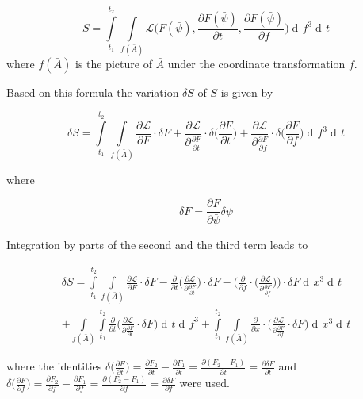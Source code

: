\documentclass{article}
\DeclareMathOperator{\dd}{d\!}
\begin{document}
\begin{equation}
S = \int\limits_{t_1}^{t_2} \int\limits_{f(\bar{A})} \mathcal{L}\bigg(F(\bar{\psi}), \frac{\partial F(\bar{\psi})}{\partial t}, \frac{\partial F(\bar{\psi})}{\partial f}\bigg) 
\dd f^3 \dd t 
\end{equation}
where $f(\bar{A})$ is the picture of $\bar{A}$ under the coordinate transformation $f$.

Based on this formula the variation $\delta S$ of $S$ is given by

\begin{equation}
\delta S = \int\limits_{t_1}^{t_2} \int\limits_{f(\bar{A})} 
\frac{\partial \mathcal{L}}{\partial F} \cdot \delta F
+ \frac{\partial \mathcal{L}}{\partial \frac{\partial F}{\partial t}} \cdot \delta \bigg(\frac{\partial F}{\partial t}\bigg)
+ \frac{\partial \mathcal{L}}{\partial \frac{\partial F}{\partial f}} \cdot \delta \bigg(\frac{\partial F} {\partial f}\bigg)
\dd f^3 \dd t
\end{equation}

where 

\begin{equation} \label{deltaFDefinition}
\delta F = \frac{\partial F}{\partial \bar{\psi}} \delta \bar{\psi}
\end{equation}


Integration by parts of the second and the third term leads to

\begin{equation} \label{calcDeltaSSection3}
\begin{split}
\delta S = \int\limits_{t_1}^{t_2} \int\limits_{f(\bar{A})} 
\frac{\partial \mathcal{L}}{\partial F} \cdot \delta F
-\frac{\partial}{\partial t} \bigg( \frac{\partial \mathcal{L}}{\partial \frac{\partial F}{\partial t}} \bigg) \cdot \delta F
-\bigg(\frac{\partial}{\partial f} \cdot \bigg( \frac{\partial \mathcal{L}}{\partial \frac{\partial F}{\partial f}} \bigg)\bigg) \cdot \delta F
\dd x^3 \dd t \\
+ \int\limits_{f(\bar{A})} \int\limits_{t_1}^{t_2} \frac{\partial}{\partial t} \bigg(\frac{\partial \mathcal{L}}{\partial \frac{\partial F}{\partial t}} \cdot \delta F \bigg) \dd t \dd f^3
+ \int\limits_{t_1}^{t_2} 
\int\limits_{f(\bar{A})} \frac{\partial}{\partial x} \cdot \bigg( \frac{\partial \mathcal{L}}{\partial \frac{\partial F}{\partial f}} \cdot \delta F \bigg) \dd x^3 \dd t
\end{split}
\end{equation}

where the identities $\delta \bigg(\frac{\partial F} {\partial t}\bigg) 
= \frac{\partial F_2} {\partial t} - \frac{\partial F_1} {\partial t}
= \frac{\partial (F_2 - F_1)} {\partial t}
= \frac{\partial \delta F} {\partial t}$ 
and
$\delta \bigg(\frac{\partial F} {\partial f}\bigg) 
= \frac{\partial F_2} {\partial f} - \frac{\partial F_1} {\partial f}
= \frac{\partial (F_2 - F_1)} {\partial f}
= \frac{\partial \delta F} {\partial f}$ 
were used. \\
\end{document}
